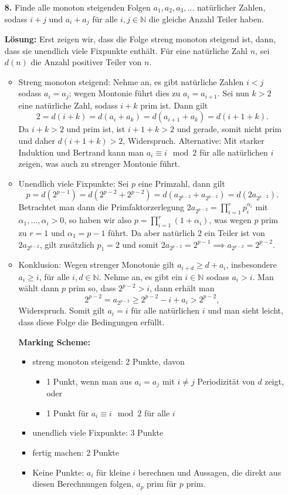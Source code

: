 \documentclass[language=german,style=solution]{smo}
\begin{document}
\begin{enumerate}
\newpage

\item[\textbf{8.}] %
Finde alle monoton steigenden Folgen $a_1, a_2, a_3, \ldots$ natürlicher Zahlen, sodass $i+j$ und $a_i+a_j$ für alle $i,j \in \mathbb{N}$ die gleiche Anzahl Teiler haben.

\textbf{Lösung:} Erst zeigen wir, dass die Folge streng monoton steigend ist, dann, dass sie unendlich viele Fixpunkte enthält. Für eine natürliche Zahl $n$, sei $d(n)$ die Anzahl positiver Teiler von $n$.
\begin{itemize}
\item Streng monoton steigend: Nehme an, es gibt natürliche Zahlen $i<j$ sodass $a_i=a_j$; wegen Montonie führt dies zu $a_i=a_{i+1}$. Sei nun $k>2$ eine natürliche Zahl, sodass $i+k$ prim ist. Dann gilt
\[
2=d(i+k)=d(a_i+a_k)=d(a_{i+1}+a_k)=d(i+1+k).
\]
Da $i+k>2$ und prim ist, ist $i+1+k>2$ und gerade, somit nicht prim und daher $d(i+1+k)>2$, Widerspruch.
Alternative: Mit starker Induktion und Bertrand kann man $a_i\equiv i \mod 2$ für alle natürlichen $i$ zeigen, was auch zu strenger Montonie führt.
\item Unendlich viele Fixpunkte: Sei $p$ eine Primzahl, dann gilt
\[
p=d(2^{p-1})=d(2^{p-2}+2^{p-2})=d(a_{2^{p-2}}+a_{2^{p-2}})=d(2a_{2^{p-2}}).
\]
Betrachtet man dann die Primfaktorzerlegung $2a_{2^{p-2}}=\prod_{i=1}^r p_i^{\alpha_i}$ mit $\alpha_1,...,\alpha_i>0$, so haben wir also $p=\prod_{i=1}^r(1+\alpha_i)$, was wegen $p$ prim zu $r=1$ und $\alpha_1=p-1$ führt. Da aber natürlich $2$ ein Teiler ist von $2a_{2^{p-2}}$, gilt zusätzlich $p_1=2$ und somit $2a_{2^{p-2}}=2^{p-1}\implies a_{2^{p-2}}=2^{p-2}$.
\item Konklusion: Wegen strenger Monotonie gilt $a_{i+d}\geq d+a_{i}$, insbesondere $a_i\geq i$, für alle $i,d\in\mathbb{N}$.  Nehme an, es gibt ein $i\in\mathbb{N}$ sodass $a_i>i$. Man wählt dann $p$ prim so, dass $2^{p-2}>i$, dann erhält man
\[
2^{p-2}=a_{2^{p-2}}\geq 2^{p-2}-i+a_i>2^{p-2},
\]
Widerspruch. Somit gilt $a_i=i$ für alle natürlichen $i$ und man sieht leicht, dass diese Folge die Bedingungen erfüllt.

\textbf{Marking Scheme:}
\begin{itemize}
\item streng monoton steigend: 2 Punkte, davon
\begin{itemize}
\item 1 Punkt, wenn man aus $a_i=a_j$ mit $i\neq j$ Periodizität von $d$ zeigt, oder
\item 1 Punkt für $a_i\equiv i \mod 2$ für alle $i$
\end{itemize}
\item unendlich viele Fixpunkte: 3 Punkte
\item fertig machen: 2 Punkte
\item Keine Punkte: $a_i$ für kleine $i$ berechnen und Aussagen, die direkt aus diesen Berechnungen folgen, $a_p$ prim für $p$ prim.
\end{itemize}
\newpage


\end{itemize}
\end{enumerate}
\end{document}
